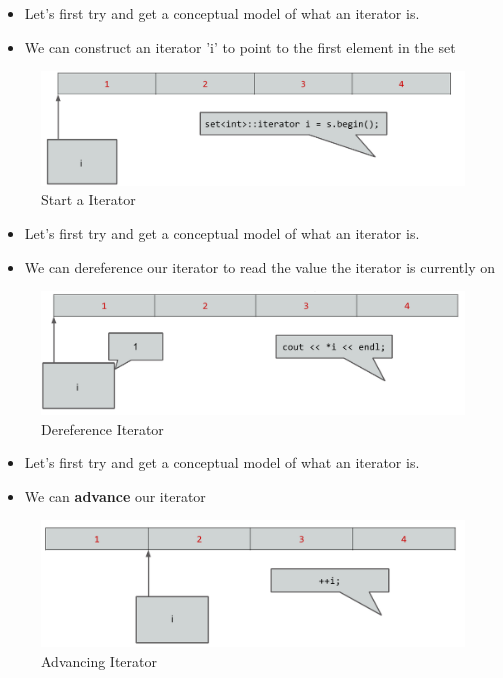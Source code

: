 \documentclass{beamer}
\newtheorem{Key points}{Key points}
\begin{document}
\begin{frame}
  \begin{itemize}
  \item  Let's first try and get a conceptual model of
what an iterator is.
\item  We can construct an iterator 'i' to point to the
first element in the set
  \end{itemize}
  \begin{figure}
    \centering
         \includegraphics[width=0.9\columnwidth]{itr3.png} 
    \caption{Start a Iterator}
  \end{figure}
\end{frame}
 
\begin{frame}
  \begin{itemize}
  \item  Let's first try and get a conceptual model of
what an iterator is.
\item  We can dereference our iterator to read the
value the iterator is currently on
  \end{itemize}
  \begin{figure}
    \centering
         \includegraphics[width=0.9\columnwidth]{itr4.png} 
    \caption{Dereference Iterator}
  \end{figure}
\end{frame}

\begin{frame}
  \begin{itemize}
  \item  Let's first try and get a conceptual model of
what an iterator is.
\item  We can \textbf{advance} our iterator
  \end{itemize}
  \begin{figure}
    \centering
         \includegraphics[width=0.9\columnwidth]{itr5.png} 
    \caption{Advancing Iterator}
  \end{figure}
\end{frame}
\end{document}
